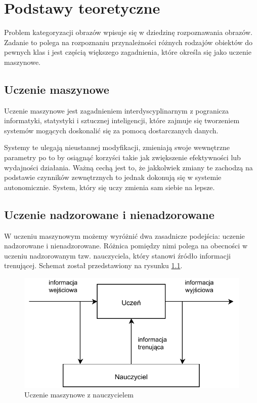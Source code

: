 \chapter{Podstawy teoretyczne}

Problem kategoryzacji obrazów wpisuje się w dziedzinę rozpoznawania obrazów. Zadanie to polega na rozpoznaniu przynależności różnych rodzajów obiektów do pewnych klas\cite{Tad91} i jest częścią większego zagadnienia, które określa się jako uczenie maszynowe.

\section{Uczenie maszynowe}

Uczenie maszynowe jest zagadnieniem interdyscyplinarnym z pogranicza informatyki, statystyki i sztucznej inteligencji, które zajmuje się tworzeniem systemów mogących doskonalić się za pomocą dostarczanych danych.

Systemy te ulegają nieustannej modyfikacji, zmieniają swoje wewnętrzne parametry po to by osiągnąć korzyści takie jak zwiększenie efektywności lub wydajności działania. Ważną cechą jest to, że jakkolwiek zmiany te zachodzą na podstawie czynników zewnętrznych to jednak dokonują się w systemie autonomicznie. System, który się uczy zmienia sam siebie na lepsze.\cite{CICHOSZ00}

\section{Uczenie nadzorowane i nienadzorowane}

W uczeniu maszynowym możemy wyróżnić dwa zasadnicze podejścia: uczenie nadzorowane i nienadzorowane. Różnica pomiędzy nimi polega na obecności w uczeniu nadzorowanym tzw. nauczyciela, który stanowi źródło informacji trenującej. Schemat został przedstawiony na rysunku \ref{fig:supervised-learning}.

\begin{figure}[h]
	\centering
	\includegraphics{graphics/01_podstawy_teoretyczne/supervised-learning.pdf}
	\caption{Uczenie maszynowe z nauczycielem \cite{CICHOSZ00}}
	\label{fig:supervised-learning}
\end{figure}

